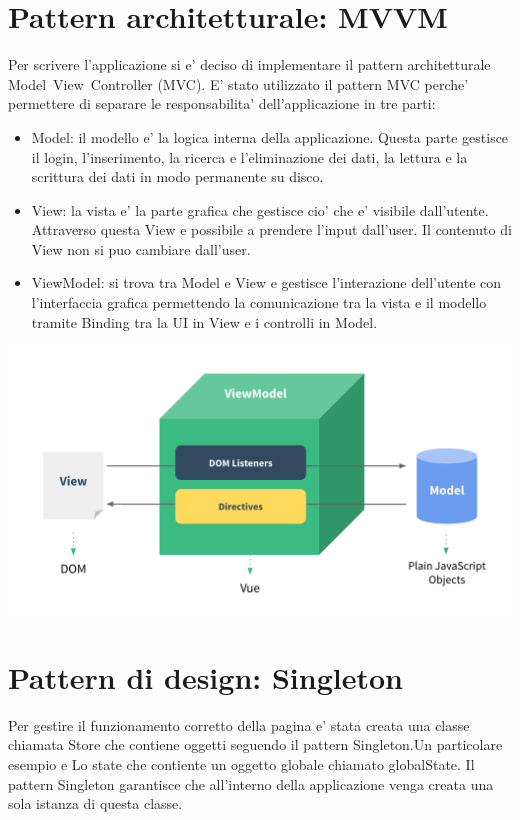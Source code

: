 \documentclass[ 4paper,11pt,openany]{book}
\begin{document}
\section{Pattern architetturale: MVVM}
Per scrivere l'applicazione si e' deciso di implementare il pattern architetturale Model~View~Controller (MVC).
E' stato utilizzato il pattern MVC perche' permettere di separare le responsabilita' dell'applicazione in tre parti:
\begin{itemize}
    \item Model: il modello e' la logica interna della applicazione. Questa parte gestisce il login, l'inserimento, la ricerca e l'eliminazione dei dati, la lettura e la scrittura dei dati in modo permanente su disco.
    \item View: la vista e' la parte grafica che gestisce cio' che e' visibile dall'utente. Attraverso questa View e possibile a prendere l'input dall'user. Il contenuto di View non si puo cambiare dall'user.
    \item ViewModel: si trova tra Model e View e gestisce l'interazione dell'utente con l'interfaccia grafica permettendo la comunicazione tra la vista e il modello tramite Binding tra la UI in View e i controlli in Model.
\end{itemize}
\begin{center}
\includegraphics[width=170mm]{Vuemvvm.png}
\end{center}

\section{Pattern di design: Singleton}
Per gestire il funzionamento corretto della pagina e' stata creata una classe chiamata Store che contiene oggetti seguendo il pattern Singleton.Un particolare esempio e Lo state che contiente un oggetto globale chiamato globalState.
Il pattern Singleton garantisce che all'interno della applicazione venga creata una sola istanza di questa classe.
\end{document}
